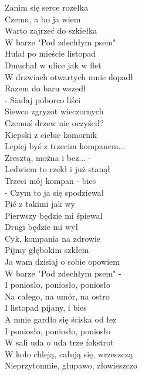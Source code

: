 
\begin{flushleft}
Zanim się serce rozełka \\
Czemu, a bo ja wiem \\
Warto zajrzeć do szkiełka \\
W barze "Pod zdechłym psem" \\
Hulał po mieście listopad \\
Dmuchał w ulice jak w flet \\
W drzwiach otwartych mnie dopadł \\
Razem do baru wszedł \\
\vskip 3mm
- Siadaj poborco liści \\
Siewco zgryzot wieczornych \\
Czemuś drzew nie oczyścił? \\
Kiepski z ciebie komornik \\
Lepiej byś z trzecim kompanem... \\
Zresztą, można i bez... - \\
Ledwiem to rzekł i już stanął \\
Trzeci mój kompan - bies \\
\vskip 3mm
- Czym to ja się spodziewał \\
Pić z takimi jak wy \\
Pierwszy będzie mi śpiewał \\
Drugi będzie mi wył \\
Cyk, kompania na zdrowie \\
Pijmy głębokim szkłem \\
Ja wam dzisiaj o sobie opowiem \\
W barze "Pod zdechłym psem" - \\
\vskip 3mm
I poniosło, poniosło, poniosło \\
Na całego, na umór, na ostro \\
I listopad pijany, i bies \\
A mnie gardło się ściska od łez \\
I poniosło, poniosło, poniosło \\
W sali uda o uda trze fokstrot \\
W koło chleją, całują się, wrzeszczą \\
Nieprzytomnie, głupawo, złowieszczo \\


\end{flushleft}
